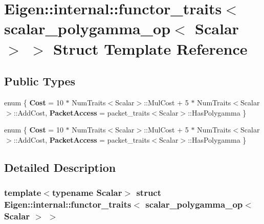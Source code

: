 \hypertarget{struct_eigen_1_1internal_1_1functor__traits_3_01scalar__polygamma__op_3_01_scalar_01_4_01_4}{}\section{Eigen\+:\+:internal\+:\+:functor\+\_\+traits$<$ scalar\+\_\+polygamma\+\_\+op$<$ Scalar $>$ $>$ Struct Template Reference}
\label{struct_eigen_1_1internal_1_1functor__traits_3_01scalar__polygamma__op_3_01_scalar_01_4_01_4}
\subsection*{Public Types}
\begin{DoxyCompactItemize}
\item 
\mbox{\label{struct_eigen_1_1internal_1_1functor__traits_3_01scalar__polygamma__op_3_01_scalar_01_4_01_4_a557e1e3a8c5df24ca2431895de758bdc}} 
enum \{ {\bfseries Cost} = 10 $\ast$ Num\+Traits$<$Scalar$>$\+:\+:Mul\+Cost + 5 $\ast$ Num\+Traits$<$Scalar$>$\+:\+:Add\+Cost, 
{\bfseries Packet\+Access} = packet\+\_\+traits$<$Scalar$>$\+:\+:Has\+Polygamma
 \}
\item 
\mbox{\label{struct_eigen_1_1internal_1_1functor__traits_3_01scalar__polygamma__op_3_01_scalar_01_4_01_4_a0746c2a9201101e668a4505d7541741c}} 
enum \{ {\bfseries Cost} = 10 $\ast$ Num\+Traits$<$Scalar$>$\+:\+:Mul\+Cost + 5 $\ast$ Num\+Traits$<$Scalar$>$\+:\+:Add\+Cost, 
{\bfseries Packet\+Access} = packet\+\_\+traits$<$Scalar$>$\+:\+:Has\+Polygamma
 \}
\end{DoxyCompactItemize}


\subsection{Detailed Description}
\subsubsection*{template$<$typename Scalar$>$\newline
struct Eigen\+::internal\+::functor\+\_\+traits$<$ scalar\+\_\+polygamma\+\_\+op$<$ Scalar $>$ $>$}



